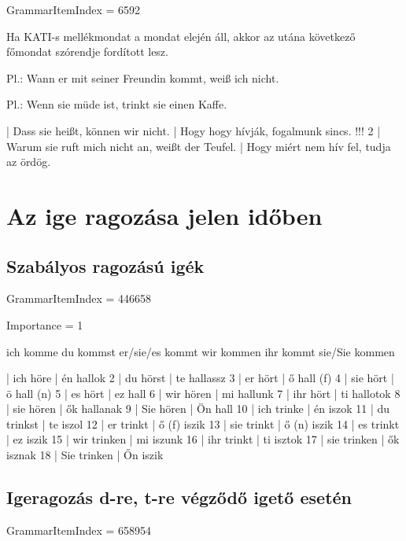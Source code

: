 \documentclass{article}
\newenvironment{desc}{\verbatim}{\endverbatim}
\newenvironment{exmp}{\verbatim}{\endverbatim}
\begin{document}
GrammarItemIndex = 6592

\begin{desc}
Ha KATI-s mellékmondat a mondat elején áll, akkor az utána következő főmondat szórendje fordított lesz.

Pl.: Wann er mit seiner Freundin kommt, weiß ich nicht.

Pl.: Wenn sie müde ist, trinkt sie einen Kaffe.
\end{desc}

\begin{exmp}
1 | Dass sie heißt, können wir nicht. | Hogy hogy hívják, fogalmunk sincs. !!!
2 | Warum sie ruft mich nicht an, weißt der Teufel. | Hogy miért nem hív fel, tudja az ördög.
\end{exmp}


\section{Az ige ragozása jelen időben}

\subsection{Szabályos ragozású igék}

GrammarItemIndex = 446658

Importance = 1

\begin{desc}
ich komme
du kommst
er/sie/es kommt
wir kommen
ihr kommt
sie/Sie kommen
\end{desc}

\begin{exmp}
1 | ich höre | én hallok
2 | du hörst | te hallassz
3 | er hört | ő hall (f)
4 | sie hört | ö hall (n)
5 | es hört | ez hall
6 | wir hören | mi hallunk
7 | ihr hört | ti hallotok
8 | sie hören | ők hallanak
9 | Sie hören | Ön hall
10 | ich trinke | én iszok
11 | du trinkst | te iszol
12 | er trinkt | ő (f) iszik
13 | sie trinkt | ő (n) iszik
14 | es trinkt | ez iszik
15 | wir trinken | mi iszunk
16 | ihr trinkt | ti isztok
17 | sie trinken | ők isznak
18 | Sie trinken | Őn iszik
\end{exmp}

\subsection{Igeragozás d-re, t-re végződő igető esetén}

GrammarItemIndex = 658954
\end{document}
